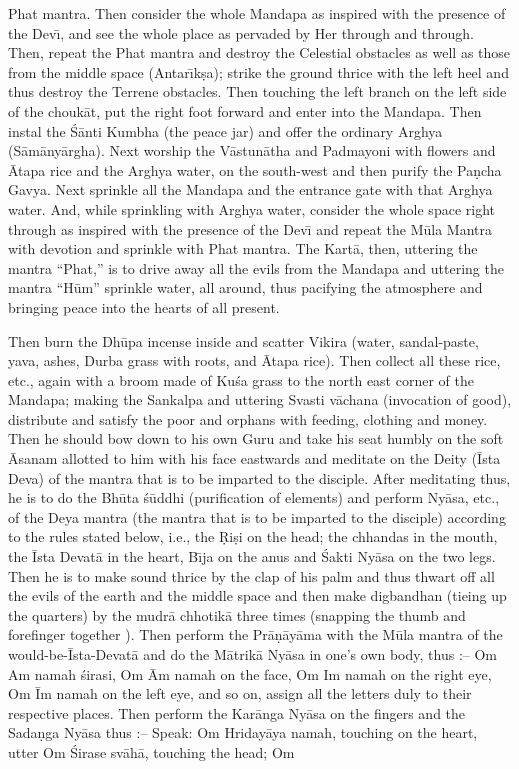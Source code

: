Phat mantra. Then consider the whole Mandapa as inspired with the presence of the Dev\={\i}, and see the whole place as pervaded by Her through and through. Then, repeat the Phat mantra and destroy the Celestial obstacles as well as those from the middle space (Antar\={\i}k\d{s}a); strike the ground thrice with the left heel and thus destroy the Terrene obstacles. Then touching the left branch on the left side of the chouk\=at, put the right foot forward and enter into the Mandapa. Then instal the \'S\=anti Kumbha (the peace jar) and offer the ordinary Arghya (S\=am\=any\=argha). Next worship the V\=astun\=atha and Padmayoni with flowers and \=Atapa rice and the Arghya water, on the south-west and then purify the Pa\d{n}cha Gavya. Next sprinkle all the Mandapa and the entrance gate with that Arghya water. And, while sprinkling with Arghya water, consider the whole space right through as inspired with the presence of the Dev\={\i} and repeat the M\=ula Mantra with devotion and sprinkle with Phat mantra. The Kart\=a, then, uttering the mantra ``Phat,'' is to drive away all the evils from the Mandapa and uttering the mantra ``H\=um'' sprinkle water, all around, thus pacifying the atmosphere and bringing peace into the hearts of all present.

Then burn the Dh\=upa incense inside and scatter Vikira (water, sandal-paste, yava, ashes, Durba grass with roots, and \=Atapa rice). Then collect all these rice, etc., again with a broom made of Ku\'sa grass to the north east corner of the Mandapa; making the Sankalpa and uttering Svasti v\=achana (invocation of good), distribute and satisfy the poor and orphans with feeding, clothing and money. Then he should bow down to his own Guru and take his seat humbly on the soft \=Asanam allotted to him with his face eastwards and meditate on the Deity (\=Ista Deva) of the mantra that is to be imparted to the disciple. After meditating thus, he is to do the Bh\=uta \'s\=uddhi (purification of elements) and perform Ny\=asa, etc., of the Deya mantra (the mantra that is to be imparted to the disciple) according to the rules stated below, i.e., the \d{R}i\d{s}i on the head; the chhandas in the mouth, the \=Ista Devat\=a in the heart, B\={\i}ja on the anus and \'Sakti Ny\=asa on the two legs. Then he is to make sound thrice by the clap of his palm and thus thwart off all the evils of the earth and the middle space and then make digbandhan (tieing up the quarters) by the mudr\=a chhotik\=a three times (snapping the thumb and forefinger together ). Then perform the Pr\=a\d{n}\=ay\=ama with the M\=ula mantra of the would-be-\=Ista-Devat\=a and do the M\=atrik\=a Ny\=asa in one's own body, thus :-- Om Am namah \'sirasi, Om \=Am namah on the face, Om Im namah on the right eye, Om \=Im namah on the left eye, and so on, assign all the letters duly to their respective places. Then perform the Kar\=anga Ny\=asa on the fingers and the Sada\d{n}ga Ny\=asa thus :-- Speak: Om Hriday\=aya namah, touching on the heart, utter Om \'Sirase sv\=ah\=a, touching the head; Om


